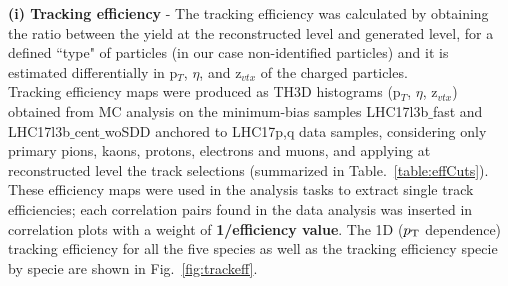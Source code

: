{\bf \normalsize (i) Tracking efficiency} - The tracking efficiency was calculated by obtaining the ratio between the yield at the reconstructed level and generated level, for a defined ``type" of particles (in our case non-identified particles) and it is estimated differentially in p$_T$, $\eta$, and z$_{vtx}$ of the charged particles.\\

Tracking efficiency maps were produced as TH3D histograms (p$_T$, $\eta$, z$_{vtx}$) obtained from MC analysis on the minimum-bias samples LHC17l3b$\_$fast and LHC17l3b$\_$cent$\_$woSDD anchored to LHC17p,q data samples, considering only primary pions, kaons, protons, electrons and muons, and applying at reconstructed level the track selections (summarized in Table.~\ref{table:effCuts}). These efficiency maps were used in the analysis tasks to extract single track efficiencies; each correlation pairs found in the data analysis was inserted in correlation plots with a weight of {\bf 1/efficiency value}. 
The 1D ($p_{\rm T}$ dependence) tracking efficiency for all the five species as well as the tracking efficiency specie by specie are shown in Fig.~\ref{fig:trackeff}.

